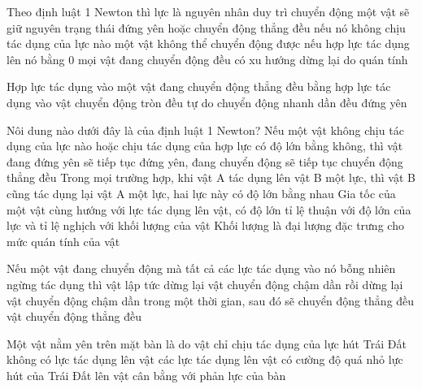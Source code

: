\begin{ex}%
Theo định luật 1 Newton thì
\choice
{lực là nguyên nhân duy trì chuyển động}
{\True một vật sẽ giữ nguyên trạng thái đứng yên hoặc chuyển động thẳng đều nếu nó không chịu tác dụng của lực nào}
{một vật không thể chuyển động được nếu hợp lực tác dụng lên nó bằng 0}
{mọi vật đang chuyển động đều có xu hướng dừng lại do quán tính}
  \end{ex}
\begin{ex}%
Hợp lực tác dụng vào một vật đang chuyển động thẳng đều bằng hợp lực tác dụng vào vật 
\choice
{chuyển động tròn đều}
{tự do}
{chuyển động nhanh dần đều}
{\True đứng yên}
  \end{ex}
\begin{ex}%
Nôi dung nào dưới đây là của định luật 1 Newton?
\choice
{\True Nếu một vật không chịu tác dụng của lực nào hoặc chịu tác dụng của hợp lực có độ lớn bằng không, thì vật đang đứng yên sẽ tiếp tục đứng yên, đang chuyển động sẽ tiếp tục chuyển động thẳng đều}
{Trong mọi trường hợp, khi vật A tác dụng lên vật B một lực, thì vật B cũng tác dụng lại vật A một lực, hai lực này có độ lớn bằng nhau}
{Gia tốc của một vật cùng hướng với lực tác dụng lên vật, có độ lớn tỉ lệ thuận với độ lớn của lực và tỉ lệ nghịch với khối lượng của vật}
{Khối lượng là đại lượng đặc trưng cho mức quán tính của vật}
 \end{ex}
\begin{ex}%
Nếu một vật đang chuyển động mà tất cả các lực tác dụng vào nó bỗng nhiên ngừng tác dụng thì
\choice
{vật lập tức dừng lại}
{vật chuyển động chậm dần rồi dừng lại}
{vật chuyển động chậm dần trong một thời gian, sau đó sẽ chuyển động thẳng đều}
{\True vật chuyển động thẳng đều}
  \end{ex}
\begin{ex}%
Một vật nằm yên trên mặt bàn là do
\choice
{vật chỉ chịu tác dụng của lực hút Trái Đất}
{không có lực tác dụng lên vật}
{các lực tác dụng lên vật có cường độ quá nhỏ}
{\True lực hút của Trái Đất lên vật cân bằng với phản lực của bàn}
  \end{ex}
